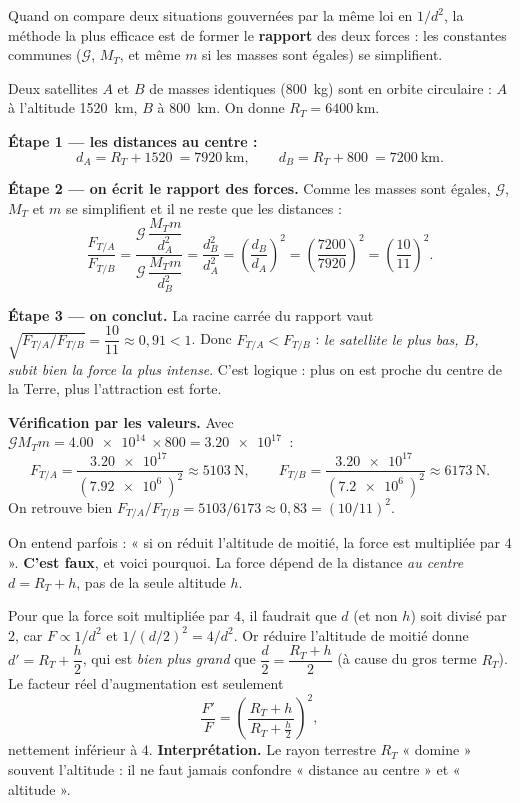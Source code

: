 \documentclass[11pt,a4paper]{article}
\newcommand{\Grav}{\mathcal{G}}        %
\begin{document}
Quand on compare deux situations gouvernées par la même loi en $1/d^2$, la méthode la
plus efficace est de former le \textbf{rapport} des deux forces : les constantes communes
($\Grav$, $M_T$, et même $m$ si les masses sont égales) se simplifient.

\begin{exemple}
Deux satellites $A$ et $B$ de masses identiques (\SI{800}{\kilogram}) sont en orbite
circulaire : $A$ à l'altitude \SI{1520}{\kilo\metre}, $B$ à \SI{800}{\kilo\metre}. On
donne $R_T=\SI{6400}{\kilo\metre}$.

\smallskip
\textbf{Étape 1 --- les distances au centre :}
\[
d_A=R_T+\SI{1520}{}=\SI{7920}{\kilo\metre},\qquad
d_B=R_T+\SI{800}{}=\SI{7200}{\kilo\metre}.
\]

\textbf{Étape 2 --- on écrit le rapport des forces.} Comme les masses sont égales,
$\Grav$, $M_T$ et $m$ se simplifient et il ne reste que les distances :
\[
\frac{F_{T/A}}{F_{T/B}}
 =\frac{\Grav\,\dfrac{M_T m}{d_A^2}}{\Grav\,\dfrac{M_T m}{d_B^2}}
 =\frac{d_B^2}{d_A^2}
 =\left(\frac{d_B}{d_A}\right)^{2}
 =\left(\frac{7200}{7920}\right)^{2}
 =\left(\frac{10}{11}\right)^{2}.
\]

\textbf{Étape 3 --- on conclut.} La racine carrée du rapport vaut
$\sqrt{F_{T/A}/F_{T/B}}=\dfrac{10}{11}\approx 0{,}91<1$. Donc $F_{T/A}<F_{T/B}$ :
\emph{le satellite le plus bas, $B$, subit bien la force la plus intense}. C'est logique :
plus on est proche du centre de la Terre, plus l'attraction est forte.

\smallskip
\textbf{Vérification par les valeurs.} Avec $\Grav M_T m=\SI{4.00e14}{}\times 800=
\SI{3.20e17}{}$ :
\[
F_{T/A}=\frac{\SI{3.20e17}{}}{(\SI{7.92e6}{})^2}\approx\SI{5103}{\newton},\qquad
F_{T/B}=\frac{\SI{3.20e17}{}}{(\SI{7.2e6}{})^2}\approx\SI{6173}{\newton}.
\]
On retrouve bien $F_{T/A}/F_{T/B}=5103/6173\approx 0{,}83=(10/11)^2$. \checkmark
\end{exemple}

\begin{exemple}
On entend parfois : « si on réduit l'altitude de moitié, la force est multipliée par
$4$ ». \textbf{C'est faux}, et voici pourquoi. La force dépend de la distance
\emph{au centre} $d=R_T+h$, pas de la seule altitude $h$.

\smallskip
Pour que la force soit multipliée par $4$, il faudrait que $d$ (et non $h$) soit divisé
par $2$, car $F\propto 1/d^2$ et $1/(d/2)^2=4/d^2$. Or réduire l'altitude de moitié donne
$d'=R_T+\dfrac{h}{2}$, qui est \emph{bien plus grand} que $\dfrac{d}{2}=\dfrac{R_T+h}{2}$
(à cause du gros terme $R_T$). Le facteur réel d'augmentation est seulement
\[
\frac{F'}{F}=\left(\frac{R_T+h}{\,R_T+\tfrac{h}{2}\,}\right)^{2},
\]
nettement inférieur à $4$. \textbf{Interprétation.} Le rayon terrestre $R_T$ « domine »
souvent l'altitude : il ne faut jamais confondre « distance au centre » et « altitude ».
\end{exemple}
\end{document}
